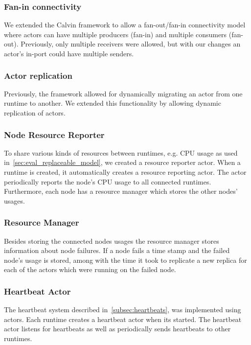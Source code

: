 \documentclass{cslthse-msc}
\begin{document}
\subsubsection{Fan-in connectivity}
We extended the Calvin framework to allow a fan-out/fan-in connectivity model where actors can have multiple producers (fan-in) and multiple consumers (fan-out). Previously, only multiple receivers were allowed, but with our changes an actor's in-port could have multiple senders.

\subsubsection{Actor replication}
Previously, the framework allowed for dynamically migrating an actor from one runtime to another. We extended this functionality by allowing dynamic replication of actors. 


\subsubsection{Node Resource Reporter}
To share various kinds of resources between runtimes, e.g. CPU usage as used in~\cref{sec:eval_replaceable_model}, we created a resource reporter actor. When a runtime is created, it automatically creates a resource reporting actor. The actor periodically reports the node's CPU usage to all connected runtimes. Furthermore, each node has a resource manager which stores the other nodes' usages.


\subsubsection{Resource Manager}
Besides storing the connected nodes usages the resource manager stores information about node failures. If a node fails a time stamp and the failed node's usage is stored, among with the time it took to replicate a new replica for each of the actors which were running on the failed node.


\subsubsection{Heartbeat Actor}
The heartbeat system described in~\cref{subsec:heartbeats}, was implemented using actors. Each runtime creates a heartbeat actor when its started. The heartbeat actor listens for heartbeats as well as periodically sends heartbeats to other runtimes.
\end{document}
